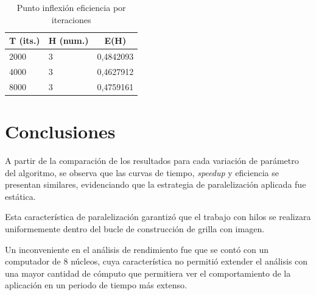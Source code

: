 \documentclass[jou]{apa6}
\begin{document}
\begin{table}[h]
\centering
\caption{Punto inflexión eficiencia por iteraciones}
\label{my-label}
\begin{tabular}{@{}lll@{}}
\toprule
\multicolumn{1}{c}{T (its.)} & \multicolumn{1}{c}{H (num.)} & \multicolumn{1}{c}{E(H)} \\ \midrule
2000                         & 3                            & 0,4842093                \\
4000                         & 3                            & 0,4627912                \\
8000                         & 3                            & 0,4759161                \\ \bottomrule
\end{tabular}
\end{table}

\section{Conclusiones}
A partir de la comparación de los resultados para cada variación de parámetro del algoritmo, se observa que las curvas de tiempo, \textit{speedup} y eficiencia se presentan similares, evidenciando que la estrategia de paralelización aplicada fue estática. 

Esta característica de paralelización garantizó que el trabajo con hilos se realizara uniformemente dentro del bucle de construcción de grilla con imagen.

Un inconveniente en el análisis de rendimiento fue que se contó con un computador de 8 núcleos, cuya característica no permitió extender el análisis con una mayor cantidad de cómputo que permitiera ver el comportamiento de la aplicación en un periodo de tiempo más extenso.
\end{document}
